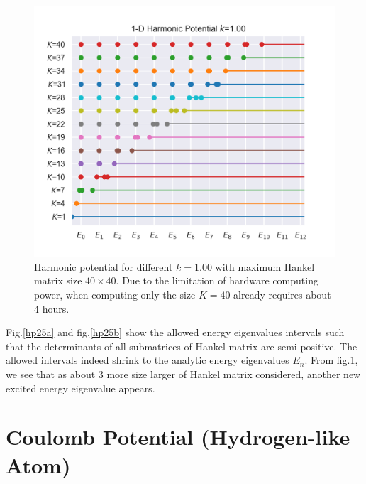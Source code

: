 \documentclass[10pt]{article}
\begin{document}
\begin{figure}[!htb]
\centering
\includegraphics[scale=0.8]{result_N40_k1.00.png}
\caption{Harmonic potential for different $k=1.00$ with maximum Hankel matrix size $40\times 40$. Due to the limitation of hardware computing power, when computing only the size $K=40$ already requires about 4 hours.}
\label{hp40}
\end{figure}



Fig.\ref{hp25a} and fig.\ref{hp25b} show the allowed energy eigenvalues intervals such that the determinants of all submatrices of Hankel matrix are semi-positive. The allowed intervals indeed shrink to the analytic energy eigenvalues $E_n$. From fig.\ref{hp40}, we see that as about $3$ more size larger of Hankel matrix considered, another new excited energy eigenvalue appears.

\section{Coulomb Potential (Hydrogen-like Atom)}\label{sec:3}
\end{document}
